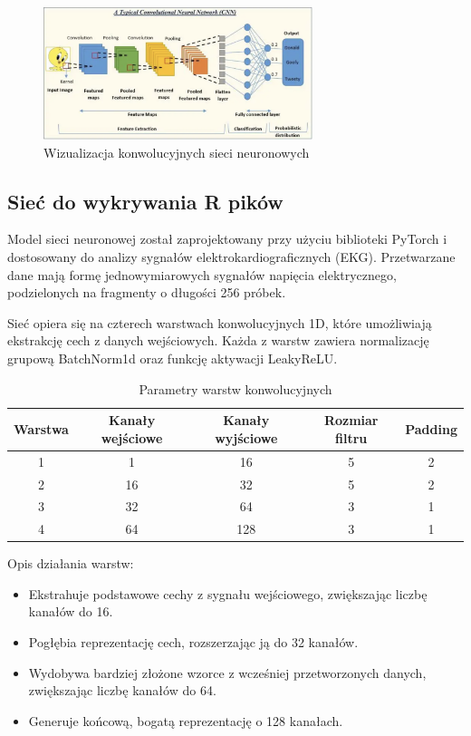 \documentclass{article}
\begin{document}
\begin{figure}[h]
    \centering
    \includegraphics[width=0.7\textwidth]{Screenshot 2025-06-04 at 19.51.57.png}
    \caption{Wizualizacja konwolucyjnych sieci neuronowych}
\end{figure}
\subsection{Sieć do wykrywania R pików}
Model sieci neuronowej został zaprojektowany przy użyciu biblioteki PyTorch i dostosowany do analizy sygnałów elektrokardiograficznych (EKG). Przetwarzane dane mają formę jednowymiarowych sygnałów napięcia elektrycznego, podzielonych na fragmenty o długości 256 próbek.

Sieć opiera się na czterech warstwach konwolucyjnych 1D, które umożliwiają ekstrakcję cech z danych wejściowych. Każda z warstw zawiera normalizację grupową BatchNorm1d oraz funkcję aktywacji LeakyReLU. 

\begin{table}[h!]
\renewcommand{\arraystretch}{1.3}
\centering
\begin{tabular}{|c|c|c|c|c|}
\hline
\textbf{Warstwa} & \textbf{Kanały wejściowe} & \textbf{Kanały wyjściowe} & \textbf{Rozmiar filtru} & \textbf{Padding} \\
\hline
1 & 1   & 16  & 5 & 2 \\
2 & 16  & 32  & 5 & 2 \\
3 & 32  & 64  & 3 & 1 \\
4 & 64  & 128 & 3 & 1 \\
\hline
\end{tabular}
\caption{Parametry warstw konwolucyjnych}
\end{table}

\vspace{0.5cm}
Opis działania warstw:
\begin{itemize}
    \item Ekstrahuje podstawowe cechy z sygnału wejściowego, zwiększając liczbę kanałów do 16.
    \item Pogłębia reprezentację cech, rozszerzając ją do 32 kanałów.
    \item Wydobywa bardziej złożone wzorce z wcześniej przetworzonych danych, zwiększając liczbę kanałów do 64.
    \item Generuje końcową, bogatą reprezentację o 128 kanałach.
\end{itemize}
\newpage
\end{document}
